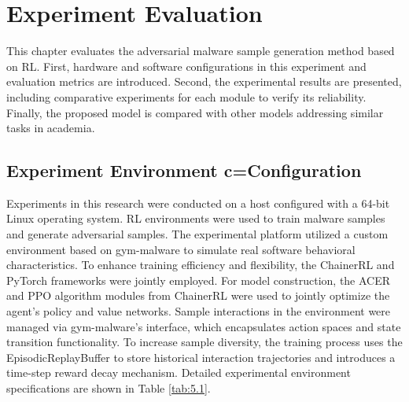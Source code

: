 %
%
%
%
%

\chapter{Experiment Evaluation}

This chapter evaluates the adversarial malware sample generation method based on RL. First, hardware and software configurations in this experiment and evaluation metrics are introduced. Second, the experimental results are presented, including comparative experiments for each module to verify its reliability. Finally, the proposed model is compared with other models addressing similar tasks in academia.

\section{Experiment Environment c=Configuration}

Experiments in this research were conducted on a host configured with a 64-bit Linux operating system. RL environments were used to train malware samples and generate adversarial samples. The experimental platform utilized a custom environment based on gym-malware to simulate real software behavioral characteristics. To enhance training efficiency and flexibility, the ChainerRL and PyTorch frameworks were jointly employed. For model construction, the ACER and PPO algorithm modules from ChainerRL were used to jointly optimize the agent's policy and value networks. Sample interactions in the environment were managed via gym-malware's interface, which encapsulates action spaces and state transition functionality. To increase sample diversity, the training process uses the EpisodicReplayBuffer to store historical interaction trajectories and introduces a time-step reward decay mechanism. Detailed experimental environment specifications are shown in Table \ref{tab:5.1}.  

